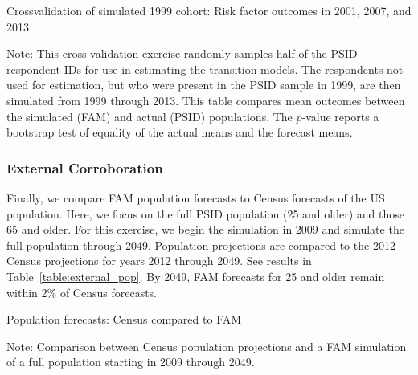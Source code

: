 \begin{table}[H]
\begin{threeparttable}
\caption{Crossvalidation of simulated 1999 cohort: Risk factor outcomes in 2001, 2007, and 2013}
\label{table:crossval_risk}
\centering
\footnotesize

\begin{tablenotes}
\footnotesize
\item Note: This cross-validation exercise randomly samples half of the PSID respondent IDs for use in estimating the transition models. The respondents not used for estimation, but who were present in the PSID sample in 1999, are then simulated from 1999 through 2013. This table compares mean outcomes between the simulated (FAM) and actual (PSID) populations. The $p$-value reports a bootstrap test of equality of the actual means and the forecast means.
\end{tablenotes}
\end{threeparttable}
\end{table}

\subsubsection{External Corroboration}
\noindent Finally, we compare FAM population forecasts to Census forecasts of the US population. Here, we focus on the full PSID population (25 and older) and those 65 and older. For this exercise, we begin the simulation in 2009 and simulate the full population through 2049. Population projections are compared to the 2012 Census projections for years 2012 through 2049. See results in Table~\ref{table:external_pop}. By 2049, FAM forecasts for 25 and older remain within 2\% of Census forecasts.

\begin{table}[H]
\begin{threeparttable}
\caption{Population forecasts: Census compared to FAM}
\label{table:external_pop}
\centering
\footnotesize

\begin{tablenotes}
\footnotesize
\item Note: Comparison between Census population projections and a FAM simulation of a full population starting in 2009 through 2049.
\end{tablenotes}
\end{threeparttable}
\end{table}


